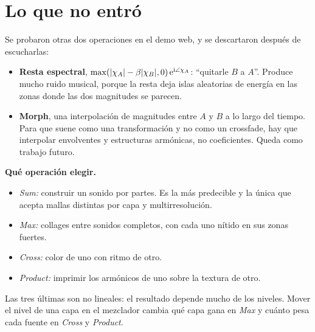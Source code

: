 \section{Lo que no entró}

Se probaron otras dos operaciones en el demo web, y se descartaron después de escucharlas:
\begin{itemize}
  \item \textbf{Resta espectral}, $\max(|\chi_A|-\beta|\chi_B|,0)\,\mathrm{e}^{\mathrm{i}\angle\chi_A}$: ``quitarle $B$
        a $A$''. Produce mucho ruido musical, porque la resta deja islas aleatorias de energía en las
        zonas donde las dos magnitudes se parecen.
  \item \textbf{Morph}, una interpolación de magnitudes entre $A$ y $B$ a lo largo del tiempo. Para
        que suene como una transformación y no como un crossfade, hay que interpolar envolventes y
        estructuras armónicas, no coeficientes. Queda como trabajo futuro.
\end{itemize}

\begin{estudio}
\textbf{Qué operación elegir.}
\begin{itemize}
  \item \emph{Sum:} construir un sonido por partes. Es la más predecible y la única que acepta
        mallas distintas por capa y multirresolución.
  \item \emph{Max:} collages entre sonidos completos, con cada uno nítido en sus zonas fuertes.
  \item \emph{Cross:} color de uno con ritmo de otro.
  \item \emph{Product:} imprimir los armónicos de uno sobre la textura de otro.
\end{itemize}
Las tres últimas son no lineales: el resultado depende mucho de los niveles. Mover el nivel de una
capa en el mezclador cambia qué capa gana en \emph{Max} y cuánto pesa cada fuente en \emph{Cross} y
\emph{Product}.
\end{estudio}
